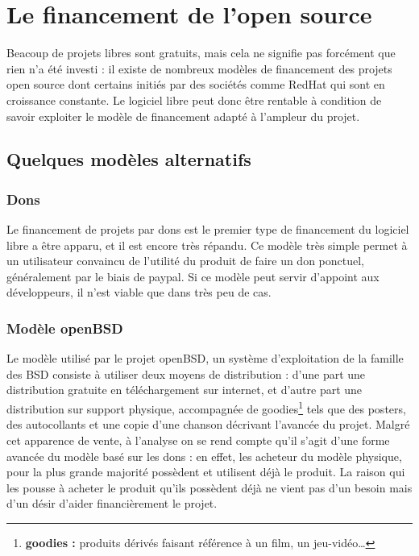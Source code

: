\chapter{Le financement de l'open source}

Beacoup de projets libres sont gratuits, mais cela ne signifie pas forcément
que rien n'a été investi : il existe de nombreux modèles de financement des
projets open source dont certains initiés par des sociétés comme RedHat
qui sont en croissance constante. Le logiciel libre peut donc être rentable à
condition de savoir exploiter le modèle de financement adapté à l'ampleur du
projet.

\section{Quelques modèles alternatifs}

    \subsection{Dons}

Le financement de projets par dons est le premier type de financement du
logiciel libre a être apparu, et il est encore très répandu.
Ce modèle très simple permet à un utilisateur convaincu de l'utilité du
produit de faire un don ponctuel, généralement par le biais de paypal.
Si ce modèle peut servir d'appoint aux développeurs, il n'est viable que dans
très peu de cas.

    \subsection{Modèle openBSD}

Le modèle utilisé par le projet openBSD, un système d'exploitation de la
famille des BSD consiste à utiliser deux moyens de distribution : d'une part
une distribution gratuite en téléchargement sur internet, et d'autre part une
distribution sur support physique, accompagnée de
goodies\footnote{\textbf{goodies :} produits dérivés faisant référence à un
film, un jeu-vidéo\ldots} tels que des posters, des autocollants et
une copie d'une chanson décrivant l'avancée du projet.  Malgré cet apparence de
vente, à l'analyse on se rend compte qu'il s'agit d'une forme avancée du modèle
basé sur les dons : en effet, les acheteur du modèle physique, pour la plus
grande majorité possèdent et utilisent déjà le produit. La raison qui les
pousse à acheter le produit qu'ils possèdent déjà ne vient pas d'un besoin mais
d'un désir d'aider financièrement le projet.

